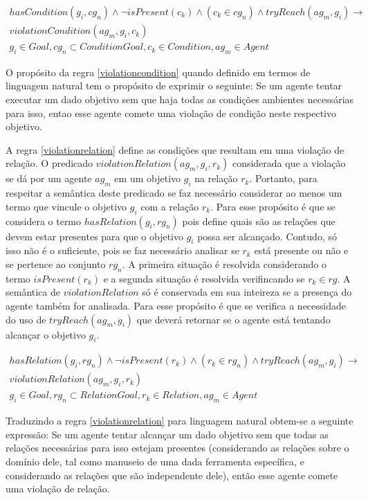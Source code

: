 \begin{eqnarray}\label{violationcondition}\nonumber
	hasCondition(g_i,cg_n) \wedge \neg isPresent(c_k) \wedge (c_k \in cg_n) \wedge tryReach(ag_m,g_i) \to \nonumber \\  
	violationCondition(ag_m,g_i,c_k) \nonumber \\  
    g_i \in Goal, cg_n \subset ConditionGoal, c_k \in Condition, ag_m \in Agent
\end{eqnarray}

O propósito da regra \ref{violationcondition} quando definido em termos de linguagem natural tem o propósito de exprimir o seguinte: Se um agente tentar 
executar um dado objetivo sem que haja todas as condições ambientes necessárias para isso, entao esse agente comete uma violação de condição neste 
respectivo objetivo. 

A regra \ref{violationrelation} define as condições que resultam em uma violação de relação. O predicado $violationRelation(ag_m,g_i,r_k)$ considerada 
que a violação se dá por um agente $ag_m$ em um objetivo $g_i$ na relação $r_k$. Portanto, para respeitar a semântica deste predicado se faz necessário 
considerar ao menos um termo que vincule o objetivo $g_i$ com a relação $r_k$. Para esse propósito é que se considera o termo $hasRelation(g_i,rg_n)$ 
pois define quais são as relações que devem estar presentes para que o objetivo $g_i$ possa ser alcançado. Contudo, só isso não é o suficiente, pois 
se faz necessário analisar se $r_k$ está presente ou não e se pertence ao conjunto $rg_n$. A primeira situação é resolvida considerando o termo $isPresent(r_k)$
e a segunda situação é resolvida verifincando se $r_k \in rg$. A semântica de $violationRelation$ só é conservada em sua inteireza se a presença do 
agente também for analisada. Para esse propósito é que se verifica a necessidade do uso de $tryReach(ag_m,g_i)$ que deverá retornar se o agente 
está tentando alcançar o objetivo $g_i$.   

\begin{eqnarray}\label{violationrelation}\nonumber
	hasRelation(g_i,rg_n)\wedge \neg isPresent(r_k) \wedge (r_k \in rg_n) \wedge tryReach(ag_m,g_i) \to \nonumber \\
	violationRelation(ag_m,g_i,r_k) \nonumber \\  
    g_i \in Goal, rg_n \subset RelationGoal, r_k \in Relation, ag_m \in Agent
\end{eqnarray}

Traduzindo a regra \ref{violationrelation} para linguagem natural obtem-se a seguinte expressão: Se um agente tentar alcançar um dado objetivo sem que todas 
as relações necessárias para isso estejam presentes (considerando as relações sobre o domínio dele, tal como manuseio de uma dada ferramenta específica, e 
considerando as relações que são independente dele), então esse agente comete uma violação de relação. 

